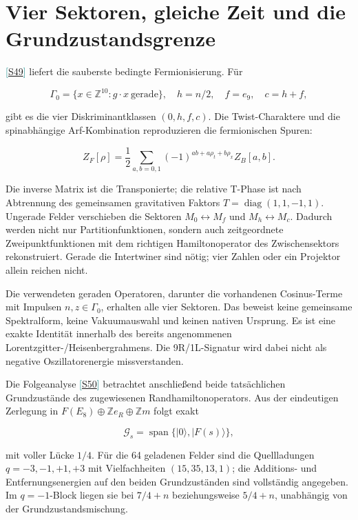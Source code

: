 \documentclass[11pt,a4paper,oneside,parskip=half,headings=normal,numbers=noenddot,bibliography=totoc]{scrreprt}
\newcommand{\src}[1]{\textcolor{teal}{\small[\hyperref[s:#1]{S#1}]}}
\begin{document}
\section{Vier Sektoren, gleiche Zeit und die Grundzustandsgrenze}

\src{49} liefert die sauberste bedingte
Fermionisierung. Für

\[
 \Gamma_0=\{x\in\mathbb Z^{10}:g\cdot x\ \mathrm{gerade}\},
 \quad h=n/2,\quad f=e_9,\quad c=h+f,
\]

gibt es die vier Diskriminantklassen $(0,h,f,c)$. Die Twist-Charaktere und
die spinabhängige Arf-Kombination reproduzieren die fermionischen Spuren:

\[
 Z_F[\rho]=\frac12\sum_{a,b=0,1}
 (-1)^{ab+a\rho_t+b\rho_x}Z_B[a,b].
\]

Die inverse Matrix ist die Transponierte; die relative T-Phase ist nach
Abtrennung des gemeinsamen gravitativen Faktors \(T=\operatorname{diag}(1,1,-1,1)\).
Ungerade Felder verschieben die Sektoren \(M_0\leftrightarrow M_f\) und
\(M_h\leftrightarrow M_c\). Dadurch werden nicht nur Partitionfunktionen,
sondern auch zeitgeordnete Zweipunktfunktionen mit dem richtigen
Hamiltonoperator des Zwischensektors rekonstruiert. Gerade die Intertwiner sind nötig; vier
Zahlen oder ein Projektor allein reichen nicht.

Die verwendeten geraden Operatoren, darunter die vorhandenen Cosinus-Terme mit
Impulsen \(n,z\in\Gamma_0\), erhalten alle vier Sektoren. Das beweist keine
gemeinsame Spektralform, keine Vakuumauswahl und keinen nativen Ursprung.
Es ist eine exakte Identität innerhalb des bereits angenommenen
Lorentzgitter-/Heisenbergrahmens. Die 9R/1L-Signatur wird dabei nicht als
negative Oszillatorenergie missverstanden.

Die Folgeanalyse \src{50} betrachtet anschließend
beide tatsächlichen Grundzustände des zugewiesenen Randhamiltonoperators.
Aus der eindeutigen Zerlegung in \(F(E_8)\oplus\mathbb Z e_R\oplus\mathbb Zm\)
folgt exakt

\[
 \mathcal G_s=\operatorname{span}\{|0\rangle,|F(s)\rangle\},
\]

mit voller Lücke $1/4$. Für die 64 geladenen Felder sind die Quellladungen
$q=-3,-1,+1,+3$ mit Vielfachheiten $(15,35,13,1)$; die Additions- und
Entfernungsenergien auf den beiden Grundzuständen sind vollständig angegeben.
Im $q=-1$-Block liegen sie bei $7/4+n$ beziehungsweise $5/4+n$,
unabhängig von der Grundzustandsmischung.
\end{document}
